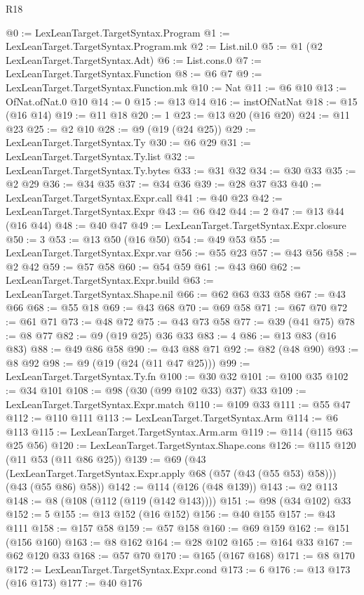 \begin{lexlean}{R18}
\begin{coremodule}
@0 := LexLeanTarget.TargetSyntax.Program
@1 := LexLeanTarget.TargetSyntax.Program.mk
@2 := List.nil.{0}
@5 := @1 (@2 LexLeanTarget.TargetSyntax.Adt)
@6 := List.cons.{0}
@7 := LexLeanTarget.TargetSyntax.Function
@8 := @6 @7
@9 := LexLeanTarget.TargetSyntax.Function.mk
@10 := Nat
@11 := @6 @10
@13 := OfNat.ofNat.{0} @10
@14 := 0
@15 := @13 @14
@16 := instOfNatNat
@18 := @15 (@16 @14)
@19 := @11 @18
@20 := 1
@23 := @13 @20 (@16 @20)
@24 := @11 @23
@25 := @2 @10
@28 := @9 (@19 (@24 @25))
@29 := LexLeanTarget.TargetSyntax.Ty
@30 := @6 @29
@31 := LexLeanTarget.TargetSyntax.Ty.list
@32 := LexLeanTarget.TargetSyntax.Ty.bytes
@33 := @31 @32
@34 := @30 @33
@35 := @2 @29
@36 := @34 @35
@37 := @34 @36
@39 := @28 @37 @33
@40 := LexLeanTarget.TargetSyntax.Expr.call
@41 := @40 @23
@42 := LexLeanTarget.TargetSyntax.Expr
@43 := @6 @42
@44 := 2
@47 := @13 @44 (@16 @44)
@48 := @40 @47
@49 := LexLeanTarget.TargetSyntax.Expr.closure
@50 := 3
@53 := @13 @50 (@16 @50)
@54 := @49 @53
@55 := LexLeanTarget.TargetSyntax.Expr.var
@56 := @55 @23
@57 := @43 @56
@58 := @2 @42
@59 := @57 @58
@60 := @54 @59
@61 := @43 @60
@62 := LexLeanTarget.TargetSyntax.Expr.build
@63 := LexLeanTarget.TargetSyntax.Shape.nil
@66 := @62 @63 @33 @58
@67 := @43 @66
@68 := @55 @18
@69 := @43 @68
@70 := @69 @58
@71 := @67 @70
@72 := @61 @71
@73 := @48 @72
@75 := @43 @73 @58
@77 := @39 (@41 @75)
@78 := @8 @77
@82 := @9 (@19 @25) @36 @33
@83 := 4
@86 := @13 @83 (@16 @83)
@88 := @49 @86 @58
@90 := @43 @88 @71
@92 := @82 (@48 @90)
@93 := @8 @92
@98 := @9 (@19 (@24 (@11 @47 @25)))
@99 := LexLeanTarget.TargetSyntax.Ty.fn
@100 := @30 @32
@101 := @100 @35
@102 := @34 @101
@108 := @98 (@30 (@99 @102 @33) @37) @33
@109 := LexLeanTarget.TargetSyntax.Expr.match
@110 := @109 @33
@111 := @55 @47
@112 := @110 @111
@113 := LexLeanTarget.TargetSyntax.Arm
@114 := @6 @113
@115 := LexLeanTarget.TargetSyntax.Arm.arm
@119 := @114 (@115 @63 @25 @56)
@120 := LexLeanTarget.TargetSyntax.Shape.cons
@126 := @115 @120 (@11 @53 (@11 @86 @25))
@139 := @69
    (@43 (LexLeanTarget.TargetSyntax.Expr.apply @68 (@57 (@43 (@55 @53) @58))) (@43 (@55 @86) @58))
@142 := @114 (@126 (@48 @139))
@143 := @2 @113
@148 := @8 (@108 (@112 (@119 (@142 @143))))
@151 := @98 (@34 @102) @33
@152 := 5
@155 := @13 @152 (@16 @152)
@156 := @40 @155
@157 := @43 @111
@158 := @157 @58
@159 := @57 @158
@160 := @69 @159
@162 := @151 (@156 @160)
@163 := @8 @162
@164 := @28 @102
@165 := @164 @33
@167 := @62 @120 @33
@168 := @57 @70
@170 := @165 (@167 @168)
@171 := @8 @170
@172 := LexLeanTarget.TargetSyntax.Expr.cond
@173 := 6
@176 := @13 @173 (@16 @173)
@177 := @40 @176

\end{coremodule}
\end{lexlean}

